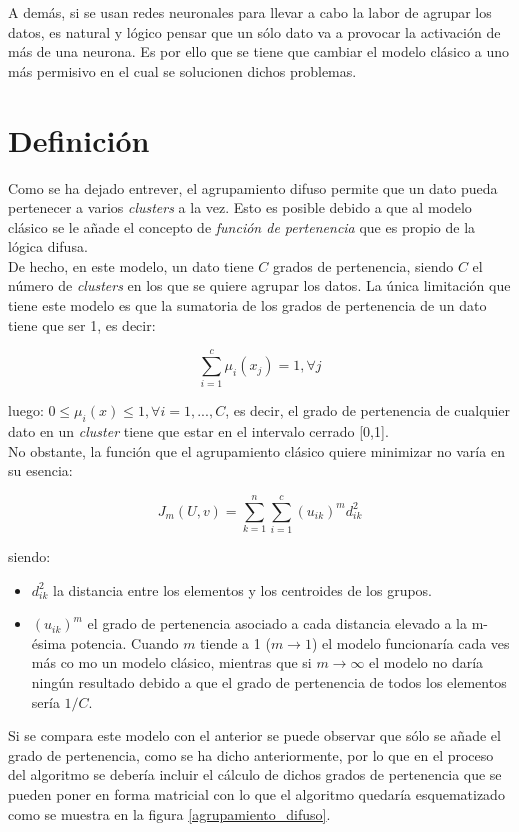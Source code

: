 \documentclass[]{report}
\begin{document}
		A demás, si se usan redes neuronales para llevar a cabo la labor de agrupar los datos, es natural y lógico pensar que un sólo dato va a provocar la activación de más de una neurona. Es por ello que se tiene que cambiar el modelo clásico a uno más permisivo en el cual se solucionen dichos problemas.
			
		\section{Definición}
			Como se ha dejado entrever, el agrupamiento difuso permite que un dato pueda pertenecer a varios \textit{clusters} a la vez. Esto es posible debido a que al modelo clásico se le añade el concepto de \textit{función de pertenencia} que es propio de la lógica difusa.\\
			
			De hecho, en este modelo, un dato tiene $C$ grados de pertenencia, siendo $C$ el número de \textit{clusters} en los que se quiere agrupar los datos. La única limitación que tiene este modelo es que la sumatoria de los grados de pertenencia de un dato tiene que ser 1, es decir:
			
			$$\sum_{i=1}^c\mu_i(x_j) = 1, \forall j$$
			
			luego: $0 \leq \mu_i(x) \leq 1, \forall i=1,...,C$, es decir, el grado de pertenencia de cualquier dato en un \textit{cluster} tiene que estar en el intervalo cerrado [0,1].\\
			
			No obstante, la función que el agrupamiento clásico quiere minimizar no varía en su esencia:
			
			$$J_m(U,v) = \sum_{k=1}^n \sum_{i=1}^c (u_{ik})^m d^2_{ik}$$

			siendo:
			\begin{itemize}
				\item $d^2_{ik}$ la distancia entre los elementos y los centroides de los grupos.
				\item $(u_{ik})^m$ el grado de pertenencia asociado a cada distancia elevado a la m-ésima potencia. Cuando $m$ tiende a 1 ($m \rightarrow 1$) el modelo funcionaría cada ves más co mo un modelo clásico, mientras que si $m \rightarrow \infty$ el modelo no daría ningún resultado debido a que el grado de pertenencia de todos los elementos sería $1/C$.
			\end{itemize}
		
			Si se compara este modelo con el anterior se puede observar que sólo se añade el grado de pertenencia, como se ha dicho anteriormente, por lo que en el proceso del algoritmo se debería incluir el cálculo de dichos grados de pertenencia que se pueden poner en forma matricial con lo que el algoritmo quedaría esquematizado como se muestra en la figura \ref{agrupamiento_difuso}.
			
\end{document}
